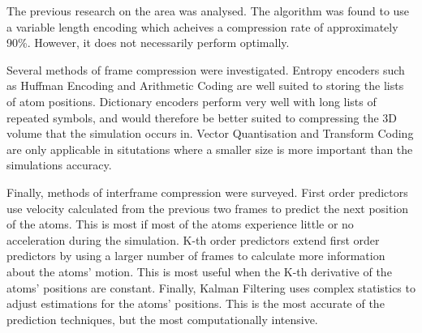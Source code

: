 \documentclass[twocolumn, a4paper,10pt]{article}
\begin{document}
The previous research on the area was analysed. The algorithm was found to use a variable length encoding which acheives a compression rate of approximately 90\%. However, it does not necessarily perform optimally.

Several methods of frame compression were investigated. Entropy encoders such as Huffman Encoding and Arithmetic Coding are well suited to storing the lists of atom positions. Dictionary encoders perform very well with long lists of repeated symbols, and would therefore be better suited to compressing the 3D volume that the simulation occurs in. Vector Quantisation and Transform Coding are only applicable in situtations where a smaller size is more important than the simulations accuracy.

Finally, methods of interframe compression were surveyed. First order predictors use velocity calculated from the previous two frames to predict the next position of the atoms. This is most if most of the atoms experience little or no acceleration during the simulation. K-th order predictors extend first order predictors by using a larger number of frames to calculate more information about the atoms' motion. This is most useful when the K-th derivative of the atoms' positions are constant. Finally, Kalman Filtering uses complex statistics to adjust estimations for the atoms' positions. This is the most accurate of the prediction techniques, but the most computationally intensive.

% 
% 
% 
% 
% 
\end{document}
